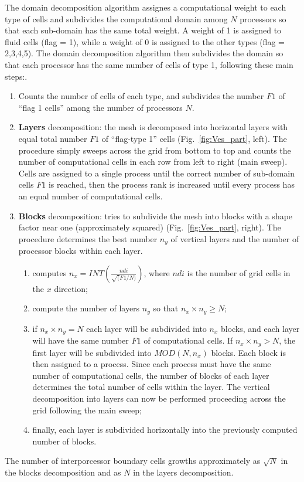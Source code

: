 The domain decomposition algorithm assignes a computational weight to each type 
of cells and subdivides the computational domain
among $N$ processors so that each sub-domain has the same total weight.
A weight of 1 is assigned to fluid cells (flag = 1),
while a weight of 0 is assigned to the other types (flag = 2,3,4,5). 
The domain decomposition algorithm then subdivides the domain so that each processor
has the same number of cells of type 1, following these main steps:.\\
\begin{enumerate}
\item Counts the number of cells of each type, and subdivides the number $F1$ of ``flag 1 cells''
 among the number of processors $N$.
\item {\bf Layers} decomposition: the mesh is decomposed into horizontal layers with equal total number
$F1$ of ``flag-type 1'' cells (Fig.~\ref{fig:Ves_part}, left). The procedure simply sweeps across
the grid from bottom to top and counts the number of computational cells in each row from
left to right (main sweep). Cells are assigned to a single process until the correct number 
of sub-domain cells $F1$ is reached, then the process rank is increased until every 
process has an equal number of computational cells.
\item {\bf Blocks} decomposition: tries to subdivide the mesh into blocks with a shape factor near one
(approximately squared) (Fig.~\ref{fig:Ves_part}, right). The procedure determines the best number
$n_y$ of vertical layers and the number of processor blocks within each layer.
\begin{enumerate}
\item computes $\displaystyle n_x = INT\left(\frac{ndi}{\sqrt(F1/N)}\right)$, where $ndi$ is the
number of grid cells in the $x$ direction;
\item compute the number of layers $n_y$ so that $n_x \times n_y \ge N$;
\item if $n_x \times n_y = N$ each layer will be subdivided into $n_x$ blocks, and each layer
will have the same number $F1$ of computational cells. If $n_x \times n_y > N$, the first 
layer will be subdivided into $MOD(N,n_x)$ blocks. Each block is then assigned to 
a process. Since each process must have the same number of computational cells, the number
of blocks of each layer determines the total number of cells within the layer. The vertical
decomposition into layers can now be performed proceeding across the grid following the
main sweep;
\item finally, each layer is subdivided horizontally into the previously computed number
of blocks. 
\end{enumerate}
\end{enumerate}
The number of interporcessor boundary cells growths approximately as $\sqrt{N}$ in the blocks
decomposition and as $N$ in the layers decomposition.\\

